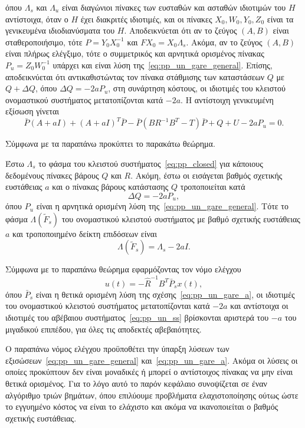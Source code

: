 όπου \( \Lambda_s \) και \( \Lambda_u \) είναι διαγώνιοι πίνακες των ευσταθών
και ασταθών ιδιοτιμών του \( H \) αντίστοιχα, όταν ο \( H \) έχει διακριτές
ιδιοτιμές, και οι πίνακες \( X_0, W_0, Y_0, Z_0 \) είναι τα γενικευμένα
ιδιοδιανύσματα του \( H \). Αποδεικνύεται ότι αν το ζεύγος \( (A, B) \) είναι
σταθεροποιήσιμο, τότε \( P = Y_0 X_0^{-1} \) και \( FX_0 = X_0\Lambda_s \).
Ακόμα, αν το ζεύγος \( (A, B) \) είναι πλήρως ελέγξιμο, τότε ο συμμετρικός και
αρνητικά ορισμένος πίνακας \( P_u = Z_0 W_0^{-1} \) υπάρχει και είναι λύση
της~\eqref{eq:pp_un_gare_general}. Επίσης, αποδεικνύεται ότι αντικαθιστώντας
τον πίνακα στάθμισης των καταστάσεων \( Q \) με \( Q + \Delta Q \), όπου \(
\Delta Q = - 2aP_u \), στη συνάρτηση κόστους, οι ιδιοτιμές του κλειστού
ονομαστικού συστήματος μετατοπίζονται κατά \( -2a \). Η αντίστοιχη γενικευμένη
εξίσωση  γίνεται
\begin{equation}\label{eq:pp_un_gare_a}
    \bar{P}(A + aI) + (A + aI)^{T}\bar{P} - \bar{P}(BR^{-1}B^{T} - T)\bar{P} +
    Q + U - 2aP_u= 0.
\end{equation}

Σύμφωνα με τα παραπάνω προκύπτει το παρακάτω θεώρημα.
\begin{theorem}
    Έστω \( \Lambda_s \) το φάσμα του κλειστού συστήματος~\eqref{eq:pp_closed}
    για κάποιους δεδομένους πίνακες βάρους \( Q \) και \( R \). Ακόμη, έστω οι
    εισάγεται βαθμός σχετικής ευστάθειας \( a \) και ο πίνακας βάρους
    κατάστασης \( Q \) τροποποιείται κατά
    \[
        \Delta Q = -2aP_u,
    \]
    όπου \( P_u \) είναι η αρνητικά ορισμένη λύση
    της~\eqref{eq:pp_un_gare_general}. Τότε το φάσμα \( \Lambda(\tilde{F}_s) \)
    του ονομαστικού κλειστού συστήματος με βαθμό σχετικής ευστάθειας \( a \)
    και τροποποιημένο δείκτη επιδόσεων είναι
    \[
        \Lambda(\tilde{F}_s) = \Lambda_s - 2aI.
    \]
\end{theorem}
Σύμφωνα με το παραπάνω θεώρημα εφαρμόζοντας τον νόμο ελέγχου
\[
    u(t) = -\hat{R}^{-1}B^T\bar{P}_sx(t),
\]
όπου \( \bar{P}_s \) είναι η θετικά ορισμένη λύση της
σχέσης~\eqref{eq:pp_un_gare_a}, οι ιδιοτιμές του ονομαστικού κλειστού
συστήματος μετατοπίζονται κατά \( -2a \) και αντίστοιχα οι ιδιοτιμές του
αβέβαιου συστήματος~\eqref{eq:pp_un_ss} βρίσκονται αριστερά του \( -a \) του
μιγαδικού επιπέδου, για όλες τις αποδεκτές αβεβαιότητες.

Ο παραπάνω νόμος ελέγχου προϋποθέτει την ύπαρξη λύσεων των εξισώσεων~\eqref{eq:pp_un_gare_general}
και~\eqref{eq:pp_un_gare_a}. Ακόμα οι λύσεις οι οποίες προκύπτουν δεν είναι
μοναδικές ή μπορεί ο αντίστοιχος πίνακας  να μην είναι θετικά
ορισμένος. Για το λόγο αυτό το παρόν κεφάλαιο συνοψίζεται σε έναν αλγόριθμο
τριών βημάτων, όπου επιλύουμε προβλήματα ελαχιστοποίησης  ούτως ώστε το
εγγυημένο κόστος να είναι το ελάχιστο και ακόμα να ικανοποιείται ο βαθμός
σχετικής ευστάθειας.


